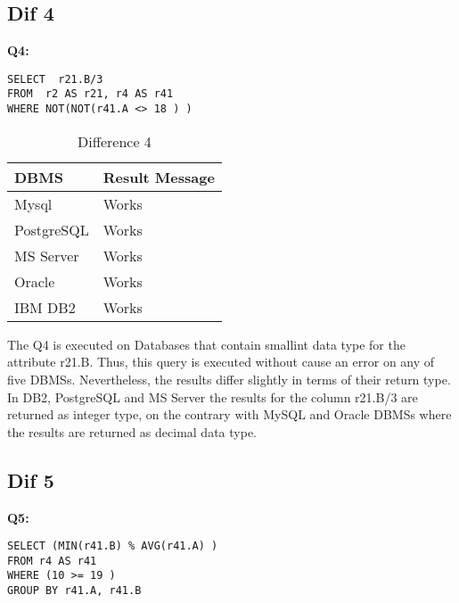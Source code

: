 \subsection{Dif 4}
  
\textbf{Q4:}
\begin{mdframed}[backgroundcolor=lightgray!20]
\begin{lstlisting}[style=SQL]
SELECT  r21.B/3
FROM  r2 AS r21, r4 AS r41
WHERE NOT(NOT(r41.A <> 18 ) )  
\end{lstlisting}
\end{mdframed}

 
\begin{table}[h]
\centering
\caption{Difference 4}
\label{my-label}
\begin{tabular}{|p{2cm}|p{11.5cm}| }
\hline
\textbf{DBMS} & \textbf{Result Message} \\ \hline
Mysql         & Works                   \\ \hline
PostgreSQL    & Works                   \\ \hline
MS Server     & Works                   \\ \hline
Oracle        & Works                   \\ \hline
IBM DB2       & Works                   \\ \hline
\end{tabular}
\end{table}

The Q4 is executed on Databases that contain smallint data type for the attribute r21.B. Thus, this query is executed without cause an error on any of five DBMSs. Nevertheless, the results differ slightly in terms of their return type. In DB2, PostgreSQL and MS Server the results for the column r21.B/3 are returned as integer type, on the contrary with MySQL and Oracle DBMSs where the results are returned as decimal data type. 

\subsection{Dif 5}
  
\textbf{Q5:}
\begin{mdframed}[backgroundcolor=lightgray!20]
\begin{lstlisting}[style=SQL]
SELECT (MIN(r41.B) % AVG(r41.A) ) 
FROM r4 AS r41
WHERE (10 >= 19 )     
GROUP BY r41.A, r41.B
\end{lstlisting}
\end{mdframed}

